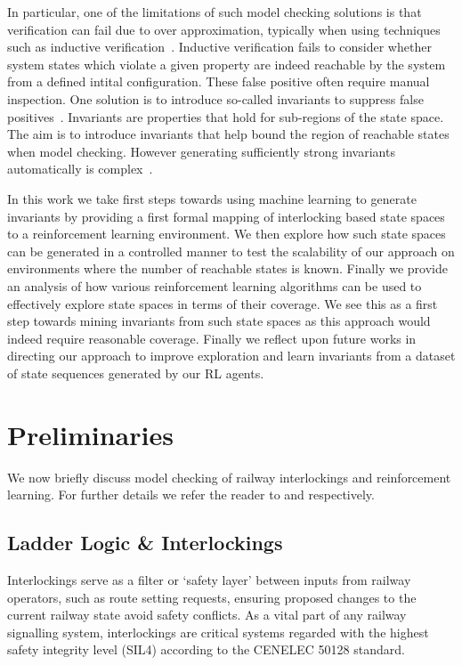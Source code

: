 \documentclass[conference,compsoc]{IEEEtran}
\begin{document}
In particular, one of the limitations of such model checking solutions is that verification can fail due to over approximation, typically when using techniques such as inductive verification~\cite{}. Inductive verification fails to consider whether system states which violate a given property are indeed reachable by the system from a defined intital configuration. These false positive  often require manual inspection. One solution is to introduce so-called invariants to suppress false positives~\cite{1688959}. Invariants are properties that hold for sub-regions of the state space. The aim is to introduce invariants that help bound the region of reachable states when model checking. However generating sufficiently strong invariants automatically is complex~\cite{}. 

In this work we take first steps towards using machine learning to generate invariants by providing a first formal mapping of interlocking based state spaces to a reinforcement learning environment. We then explore how such state spaces can be generated in a controlled manner to test the scalability of our approach on environments where the number of reachable states is known. Finally we provide an analysis of how various reinforcement learning algorithms can be used to effectively explore state spaces in terms of their coverage. We see this as a first step towards mining invariants from such state spaces as this approach would indeed require reasonable coverage. Finally we reflect upon future works in directing our approach to improve exploration and learn invariants from a dataset of state sequences generated by our RL agents. 


\section{Preliminaries}\label{sec:preliminaries}
We now briefly discuss  model checking of railway interlockings and reinforcement learning. For further details we refer the reader to \cite{kanso2009automated, james2013verification} and \cite{mnih2016asynchronous} respectively.

\subsection{Ladder Logic \& Interlockings}
Interlockings serve as a filter or ‘safety layer’ between inputs from railway operators, such as route setting requests, ensuring proposed changes to the current railway state avoid safety conflicts. As a vital part of any railway signalling system, interlockings are critical systems regarded with the highest safety integrity level
(SIL4) according to the CENELEC 50128 standard. 
\end{document}
